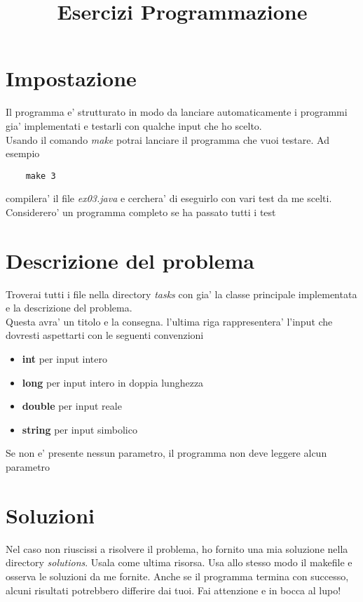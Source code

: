 \documentclass{article}
\begin{document}
\title{Esercizi Programmazione}
\maketitle

\section*{Impostazione}
Il programma e' strutturato in modo da lanciare automaticamente i programmi gia'
implementati e testarli con qualche input che ho scelto. \\
Usando il comando \textit{make} potrai lanciare il programma che vuoi testare.
Ad esempio
\begin{verbatim}
    make 3
\end{verbatim}
compilera' il file \textit{ex03.java} e cerchera' di eseguirlo con vari test da
me scelti. Considerero' un programma completo se ha passato tutti i test \\

\section*{Descrizione del problema}
Troverai tutti i file nella directory \textit{tasks} con gia' la classe
principale implementata e la descrizione del problema. \\
Questa avra' un titolo e la consegna. l'ultima riga rappresentera' l'input che
dovresti aspettarti con le seguenti convenzioni
\begin{itemize}
    \item \textbf{int} per input intero
    \item \textbf{long} per input intero in doppia lunghezza
    \item \textbf{double} per input reale
    \item \textbf{string} per input simbolico
\end{itemize}
Se non e' presente nessun parametro, il programma non deve leggere alcun parametro

\section*{Soluzioni}
Nel caso non riuscissi a risolvere il problema, ho fornito una mia soluzione
nella directory \textit{solutions}. Usala come ultima risorsa. Usa allo stesso
modo il makefile e osserva le soluzioni da me fornite. Anche se il programma
termina con successo, alcuni risultati potrebbero differire dai tuoi.
Fai attenzione e in bocca al lupo!
\end{document}
